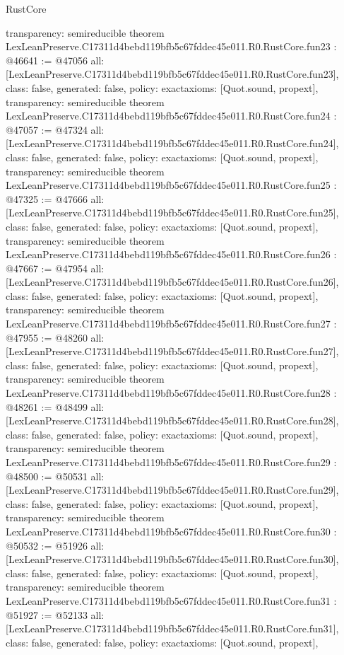\begin{lexlean}{RustCore}
\begin{coremodule}
{  transparency: semireducible
}
theorem LexLeanPreserve.C17311d4bebd119bfb5c67fddec45e011.R0.RustCore.fun23 : @46641 := @47056 {
  all: [LexLeanPreserve.C17311d4bebd119bfb5c67fddec45e011.R0.RustCore.fun23],
  class: false,
  generated: false,
  policy: exact{axioms: [Quot.sound, propext]},
  transparency: semireducible
}
theorem LexLeanPreserve.C17311d4bebd119bfb5c67fddec45e011.R0.RustCore.fun24 : @47057 := @47324 {
  all: [LexLeanPreserve.C17311d4bebd119bfb5c67fddec45e011.R0.RustCore.fun24],
  class: false,
  generated: false,
  policy: exact{axioms: [Quot.sound, propext]},
  transparency: semireducible
}
theorem LexLeanPreserve.C17311d4bebd119bfb5c67fddec45e011.R0.RustCore.fun25 : @47325 := @47666 {
  all: [LexLeanPreserve.C17311d4bebd119bfb5c67fddec45e011.R0.RustCore.fun25],
  class: false,
  generated: false,
  policy: exact{axioms: [Quot.sound, propext]},
  transparency: semireducible
}
theorem LexLeanPreserve.C17311d4bebd119bfb5c67fddec45e011.R0.RustCore.fun26 : @47667 := @47954 {
  all: [LexLeanPreserve.C17311d4bebd119bfb5c67fddec45e011.R0.RustCore.fun26],
  class: false,
  generated: false,
  policy: exact{axioms: [Quot.sound, propext]},
  transparency: semireducible
}
theorem LexLeanPreserve.C17311d4bebd119bfb5c67fddec45e011.R0.RustCore.fun27 : @47955 := @48260 {
  all: [LexLeanPreserve.C17311d4bebd119bfb5c67fddec45e011.R0.RustCore.fun27],
  class: false,
  generated: false,
  policy: exact{axioms: [Quot.sound, propext]},
  transparency: semireducible
}
theorem LexLeanPreserve.C17311d4bebd119bfb5c67fddec45e011.R0.RustCore.fun28 : @48261 := @48499 {
  all: [LexLeanPreserve.C17311d4bebd119bfb5c67fddec45e011.R0.RustCore.fun28],
  class: false,
  generated: false,
  policy: exact{axioms: [Quot.sound, propext]},
  transparency: semireducible
}
theorem LexLeanPreserve.C17311d4bebd119bfb5c67fddec45e011.R0.RustCore.fun29 : @48500 := @50531 {
  all: [LexLeanPreserve.C17311d4bebd119bfb5c67fddec45e011.R0.RustCore.fun29],
  class: false,
  generated: false,
  policy: exact{axioms: [Quot.sound, propext]},
  transparency: semireducible
}
theorem LexLeanPreserve.C17311d4bebd119bfb5c67fddec45e011.R0.RustCore.fun30 : @50532 := @51926 {
  all: [LexLeanPreserve.C17311d4bebd119bfb5c67fddec45e011.R0.RustCore.fun30],
  class: false,
  generated: false,
  policy: exact{axioms: [Quot.sound, propext]},
  transparency: semireducible
}
theorem LexLeanPreserve.C17311d4bebd119bfb5c67fddec45e011.R0.RustCore.fun31 : @51927 := @52133 {
  all: [LexLeanPreserve.C17311d4bebd119bfb5c67fddec45e011.R0.RustCore.fun31],
  class: false,
  generated: false,
  policy: exact{axioms: [Quot.sound, propext]},
}
\end{coremodule}
\end{lexlean}
